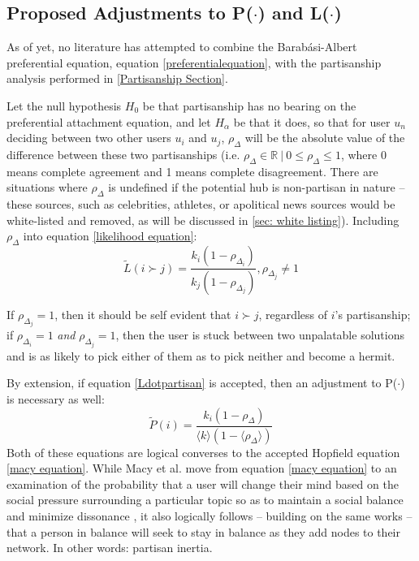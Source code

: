 \documentclass[preprint,review,12pt]{elsarticle}
\begin{document}
\subsection{Proposed Adjustments to P($\cdot$) and L($\cdot$)}
As of yet, no literature has attempted to combine the Barab{\'a}si-Albert preferential equation, equation \ref{preferentialequation}, with the partisanship analysis performed in \ref{Partisanship Section}.

Let the null hypothesis $H_0$ be that partisanship has no bearing on the preferential attachment equation, and let $H_\alpha$ be that it does, so that for user $u_n$ deciding between two other users $u_i$ and $u_j$, $\rho_{\Delta}$ will be the absolute value of the difference between these two partisanships (i.e. $\rho_{\Delta} \in \mathbb{R} \ |\  0 \leq \rho_{\Delta} \leq 1$, where 0 means complete agreement and 1 means complete disagreement. There are situations where $\rho_{\Delta}$ is undefined if the potential hub is non-partisan in nature -- these sources, such as celebrities, athletes, or apolitical news sources would be white-listed and removed, as will be discussed in \ref{sec: white listing}). Including $\rho_\Delta$ into equation
\ref{likelihood equation}:
\begin{equation}
\label{Ldotpartisan}
        \tilde{L}(i \succ j)=\frac{k_i(1-\rho_{\Delta_i})}{k_j(1-\rho_{\Delta_j})},\rho_{\Delta_j}\neq 1 
\end{equation}

If $\rho_{\Delta_j} = 1$, then it should be self evident that $i \succ j$, regardless of $i$'s partisanship; if $\rho_{\Delta_i} = 1$ \textit{and} $\rho_{\Delta_j} = 1$, then the user is stuck between two unpalatable solutions and is as likely to pick either of them as to pick neither and become a hermit. 

By extension, if equation \ref{Ldotpartisan} is accepted, then an adjustment to P($\cdot$) is necessary as well:
\begin{equation}
\label{Pdotpartisan}
        \tilde{P}(i)= \frac{k_i(1-\rho_{\Delta})}{\langle k \rangle  (1-\langle\rho_{\Delta}\rangle) }
\end{equation}
Both of these equations are logical converses to the accepted Hopfield equation \ref{macy equation}. While Macy et al. move from equation \ref{macy equation} to an examination of the probability that a user will change their mind based on the social pressure surrounding a particular topic so as to maintain a social balance and minimize dissonance \cite{macy2003polarization}, it also logically follows -- building on the same works \cite{kitts1999structural,heider1982psychology,cartwright1956structural,hopfield1982neural,hopfield1985neural,nowak1998toward} -- that a person in balance will seek to stay in balance as they add nodes to their network. In other words: partisan inertia.
\end{document}
